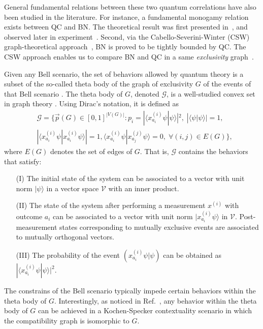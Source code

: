 \documentclass[prl,letterpaper,english,reprint,nofootinbib,aps,superscriptaddress,showpacs,showkeys]{revtex4-1}
\theoremstyle{definition}
\theoremstyle{remark}
\begin{document}
General fundamental relations between these two quantum correlations have also been studied in the literature. For instance, a fundamental monogamy relation exists between QC and BN. The theoretical result was first presented in~\cite{Kurzynski}, and observed later in experiment~\cite{Li}. Second, via the Cabello-Severini-Winter (CSW) graph-theoretical approach~\cite{CSW14}, BN is proved to be tightly bounded by QC.
The CSW approach enables us to compare BN and QC in a same \emph{exclusivity} graph~\cite{definition}.


Given any Bell scenario, the set of behaviors allowed by quantum theory is a subset of the so-called theta body of the graph of exclusivity $G$ of the events of that Bell scenario \cite{CSW14}.
The theta body of $G$, denoted $\mathcal{G}$, is a well-studied convex set in graph theory \cite{GLS88,GLS86,Knuth94}.
Using Dirac's notation, it is defined as
\begin{eqnarray*} \label{thb}
&\mathcal{G} = \{ \vec{p}(G) \in [0,1]^{|V(G)|} : p_i = |\langle x^{(i)}_{a_i} \psi | \psi \rangle|^2,\; |\langle \psi| \psi \rangle| = 1,\\
&|\langle x^{(i)}_{a_i}\psi | x^{(i)}_{a_i}\psi \rangle| = 1,\langle x^{(i)}_{a_i}\psi | x^{(j)}_{a_j}\psi \rangle = 0,\;\forall (i,j) \in E(G) \},
\end{eqnarray*}
where $E(G)$ denotes the set of edges of $G$. That is, $\mathcal{G}$ contains the behaviors that satisfy:
\begin{itemize}
 \item[(I)] The initial state of the system can be associated to a vector with unit norm $| \psi \rangle$ in a vector space ${\mathcal V}$ with an inner product.
 \item[(II)] The state of the system after performing a measurement $x^{(i)}$ with outcome $a_i$ can be associated to a vector with unit norm $ | x^{(i)}_{a_i}\psi \rangle$ in ${\mathcal V}$. Post-measurement states corresponding to mutually exclusive events are associated to mutually orthogonal vectors.
 \item[(III)] The probability of the event $(x^{(i)}_{a_i} \psi | \psi)$ can be obtained as $|\langle x^{(i)}_{a_i} \psi | \psi \rangle|^2$.
\end{itemize}
The constrains of the Bell scenario typically impede certain behaviors within the theta body of $G$. Interestingly, as noticed in Ref.\ \cite{CSW14}, any behavior within the theta body of $G$ can be achieved in a Kochen-Specker contextuality scenario in which the compatibility graph is isomorphic to $G$.
\end{document}
